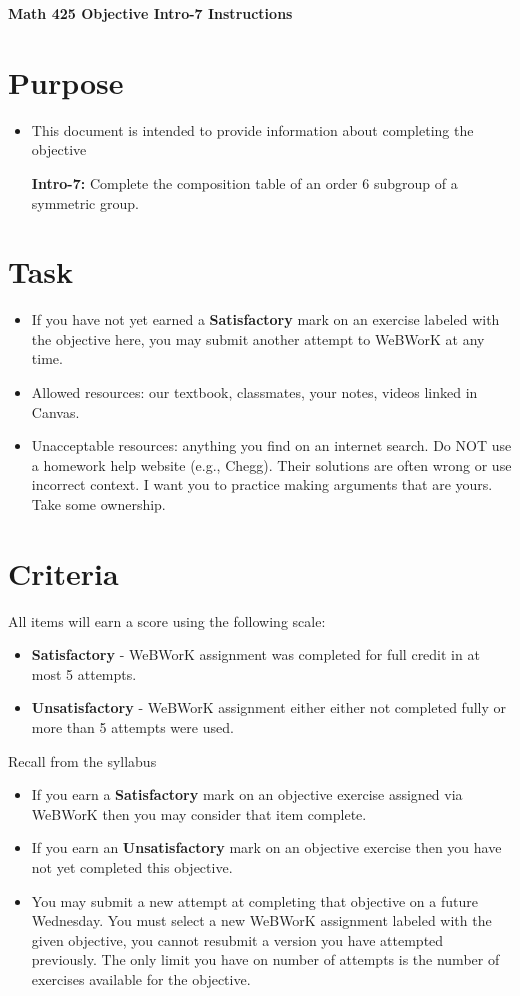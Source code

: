 \documentclass[12pt]{article}
\begin{document}
	\begin{center}
		{\Large \bf Math 425 Objective Intro-7 Instructions}
	\end{center}
	\section*{Purpose}
	\begin{itemize}
		\item This document is intended to provide information about completing the objective
		
			\textbf{Intro-7:} Complete the composition table of an order 6 subgroup of a symmetric group.

	\end{itemize}
	\section*{Task}
	\begin{itemize}
		\item If you have not yet earned a \textbf{Satisfactory} mark on an exercise labeled with the objective here, you may submit another attempt to WeBWorK at any time.
		\item Allowed resources: our textbook, classmates, your notes, videos linked in Canvas.
		\item Unacceptable resources: anything you find on an internet search. Do NOT use a homework help website (e.g., Chegg). Their solutions are often wrong or use incorrect context.  I want you to practice making arguments that are yours. Take some ownership.
	\end{itemize}
	\section*{Criteria}
	All items will earn a score using the following scale:
	\begin{itemize}
		\item \textbf{Satisfactory} - WeBWorK assignment was completed for full credit in at most 5 attempts.
		\item \textbf{Unsatisfactory} - WeBWorK assignment either either not completed fully or more than 5 attempts were used.
	\end{itemize}
	Recall from the syllabus
	\begin{itemize}
		\item If you earn a \textbf{Satisfactory} mark on an objective exercise assigned via WeBWorK  then you may consider that item complete. 
		\item If you earn an \textbf{Unsatisfactory} mark on an objective exercise then you have not yet completed this objective.
		\item You may submit a new attempt at completing that objective on a future Wednesday. You must select a new WeBWorK assignment labeled with the given objective, you cannot resubmit a version you have attempted previously.  The only limit you have on number of attempts is the number of exercises available for the objective.
	\end{itemize}
	
\end{document}
